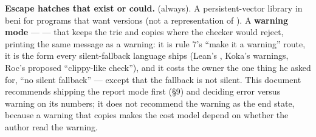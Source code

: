 \textbf{Escape hatches that exist or could.}  (always). A persistent-vector library in beni for programs that want versions (not a representation of ). A \textbf{warning mode} —  — that keeps the trie and copies where the checker would reject, printing the same message as a warning: it is rule 7's “make it a warning” route, it is the form every silent-fallback language ships (Lean's , Koka's  warnings, Roc's proposed “clippy-like check”), and it costs the owner the one thing he asked for, “no silent fallback” — except that the fallback is not silent. This document recommends shipping the report mode first (§9) and deciding error versus warning on its numbers; it does not recommend the warning as the end state, because a warning that copies makes the cost model depend on whether the author read the warning.
